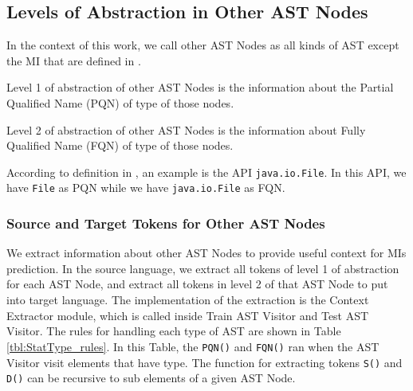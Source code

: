 \subsection{Levels of Abstraction in Other AST Nodes}
In the context of this work, we call other AST Nodes as all kinds of AST except the MI that are defined in \cite{id:ASTDocumentation}.
\begin{definition}
Level 1 of abstraction of other AST Nodes is the information about the Partial Qualified Name (PQN) of type of those nodes.
\end{definition}
\begin{definition}
Level 2 of abstraction of other AST Nodes is the information about Fully Qualified Name (FQN) of type of those nodes.
\end{definition}
According to definition in \cite{8453132}, an example is the API \texttt{java.io.File}. In this API, we have \texttt{File} as PQN while we have \texttt{java.io.File} as FQN.

\subsubsection{Source and Target Tokens for Other AST Nodes}
We extract information about other AST Nodes to provide useful context for MIs prediction. In the source language, we extract all tokens of level 1 of abstraction for each AST Node, and extract all tokens in level 2 of that AST Node to put into target language. The implementation of the extraction is the Context Extractor module, which is called inside Train AST Visitor and Test AST Visitor. The rules for handling each type of AST are shown in Table \ref{tbl:StatType_rules}. In this Table, the \texttt{PQN()} and \texttt{FQN()} ran when the AST Visitor visit elements that have type. The function for extracting tokens \texttt{S()} and \texttt{D()} can be recursive to sub elements of a given AST Node.

